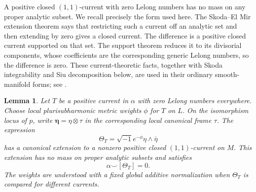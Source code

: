 \documentclass[11pt,letterpaper]{article}
\newcommand{\ii}{\sqrt{-1}}
\newtheorem{lemma}[theorem]{Lemma}
\theoremstyle{definition}
\theoremstyle{remark}
\begin{document}
A positive closed $(1,1)$-current with zero Lelong numbers has no mass
on any proper analytic subset.  We recall precisely the form used here.
The Skoda--El Mir extension theorem says that restricting such a current
off an analytic set and then extending by zero gives a closed current.
The difference is a positive closed current supported on that set.  The
support theorem reduces it to its divisorial components, whose
coefficients are the corresponding generic Lelong numbers, so the
difference is zero.  These current-theoretic facts, together with Skoda
integrability and Siu decomposition below, are used in their ordinary
smooth-manifold forms; see \cite{DemaillyComplexAnalyticGeometry}.

\begin{lemma}\label{fol:transverse-current}
Let $T$ be a positive current in $\alpha$ with zero Lelong numbers
everywhere.  Choose local plurisubharmonic metric weights $\phi$ for
$T$ on $L$.  On the isomorphism locus of $p$, write
$\boldsymbol\eta=\eta\otimes\tau$ in the corresponding local canonical
frame $\tau$.  The expression
\begin{equation}\label{fol:Theta-definition}
 \Theta_T=\ii e^{-\phi}\eta\wedge\bar\eta
\end{equation}
has a canonical extension to a nonzero positive closed $(1,1)$-current
on $M$.  This extension has no mass on proper analytic subsets and satisfies
\begin{equation}\label{fol:Theta-orthogonality}
 \alpha\smile[\Theta_T]=0.
\end{equation}
The weights are understood with a fixed global additive normalization
when $\Theta_T$ is compared for different currents.
\end{lemma}
\end{document}
